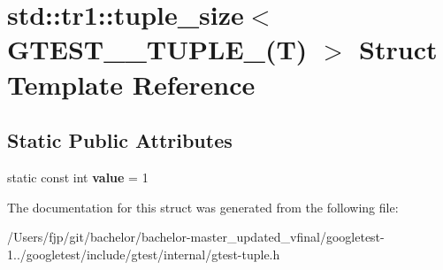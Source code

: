 \hypertarget{structstd_1_1tr1_1_1tuple__size_3_01_g_t_e_s_t__1___t_u_p_l_e___07_t_08_01_4}{}\section{std\+:\+:tr1\+:\+:tuple\+\_\+size$<$ G\+T\+E\+S\+T\+\_\+\_\+\+T\+U\+P\+L\+E\+\_\+(T) $>$ Struct Template Reference}
\label{structstd_1_1tr1_1_1tuple__size_3_01_g_t_e_s_t__1___t_u_p_l_e___07_t_08_01_4}
\subsection*{Static Public Attributes}
\begin{DoxyCompactItemize}
\item 
\mbox{\label{structstd_1_1tr1_1_1tuple__size_3_01_g_t_e_s_t__1___t_u_p_l_e___07_t_08_01_4_a02cb0da1163ad7eb74782b8f63420d5a}} 
static const int {\bfseries value} = 1
\end{DoxyCompactItemize}


The documentation for this struct was generated from the following file\+:\begin{DoxyCompactItemize}
\item 
/\+Users/fjp/git/bachelor/bachelor-\/master\+\_\+updated\+\_\+vfinal/googletest-\/1../googletest/include/gtest/internal/gtest-\/tuple.\+h\end{DoxyCompactItemize}
